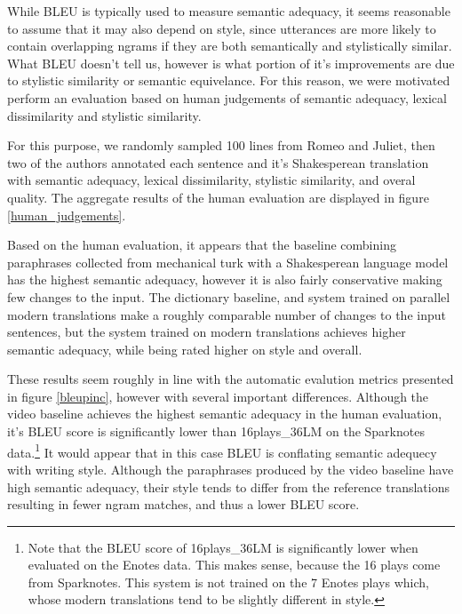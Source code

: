 \documentclass[10pt,a5paper,twoside]{article}
\begin{document}
While BLEU is typically used to measure semantic adequacy, it seems reasonable to assume that it may also depend on style, since utterances
are more likely to contain overlapping ngrams if they are both semantically and stylistically similar.  What BLEU doesn't tell us, however
is what portion of it's improvements are due to stylistic similarity or semantic equivelance.  For this reason, we were motivated perform
an evaluation based on human judgements of semantic adequacy, lexical dissimilarity and stylistic similarity.

For this purpose, we randomly sampled 100 lines from Romeo and Juliet, then two of the authors annotated each sentence and it's Shakesperean
translation with semantic adequacy, lexical dissimilarity, stylistic similarity, and overal quality.
The aggregate results of the human evaluation are displayed in figure \ref{human_judgements}.

Based on the human evaluation, it appears that the baseline combining paraphrases collected from mechanical turk \cite{chen11} with
a Shakesperean language model has the highest semantic adequacy, however it is also fairly conservative making few changes to the input.
The dictionary baseline, and system trained on parallel modern translations make a roughly comparable number of changes to the input
sentences, but the system trained on modern translations achieves higher semantic adequacy, while being rated higher on style and overall.

These results seem roughly in line with the automatic evalution metrics presented in figure \ref{bleupinc}, however with several important
differences.  Although the video baseline achieves the highest semantic adequacy in the human evaluation, it's BLEU score
is significantly lower than 16plays\_36LM on the Sparknotes data.\footnote{
Note that the BLEU score of 16plays\_36LM is significantly lower when evaluated on the Enotes data.  This makes sense, because the 
16 plays come from Sparknotes. This system is not trained on the 7 Enotes plays which, whose modern translations tend
to be slightly different in style.}
It would appear that in this case BLEU is conflating semantic adequecy with writing style.  Although the paraphrases produced 
by the video baseline have high semantic adequacy, their style tends to differ from the reference translations resulting
in fewer ngram matches, and thus a lower BLEU score.
\end{document}
